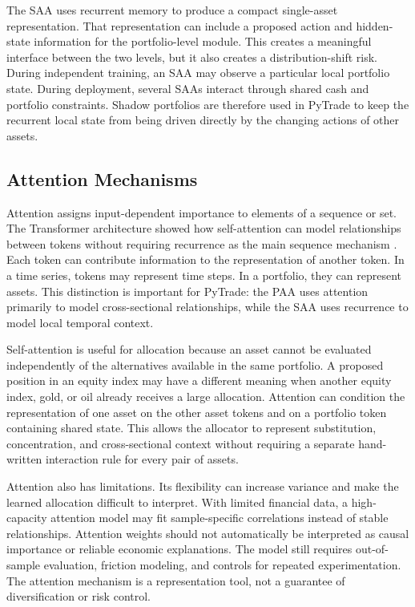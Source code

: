 The SAA uses recurrent memory to produce a compact single-asset representation. That representation can include a proposed action and hidden-state information for the portfolio-level module. This creates a meaningful interface between the two levels, but it also creates a distribution-shift risk. During independent training, an SAA may observe a particular local portfolio state. During deployment, several SAAs interact through shared cash and portfolio constraints. Shadow portfolios are therefore used in PyTrade to keep the recurrent local state from being driven directly by the changing actions of other assets.

\subsection{Attention Mechanisms}


Attention assigns input-dependent importance to elements of a sequence or set. The Transformer architecture showed how self-attention can model relationships between tokens without requiring recurrence as the main sequence mechanism \cite{vaswani2023attentionneed}. Each token can contribute information to the representation of another token. In a time series, tokens may represent time steps. In a portfolio, they can represent assets. This distinction is important for PyTrade: the PAA uses attention primarily to model cross-sectional relationships, while the SAA uses recurrence to model local temporal context.

Self-attention is useful for allocation because an asset cannot be evaluated independently of the alternatives available in the same portfolio. A proposed position in an equity index may have a different meaning when another equity index, gold, or oil already receives a large allocation. Attention can condition the representation of one asset on the other asset tokens and on a portfolio token containing shared state. This allows the allocator to represent substitution, concentration, and cross-sectional context without requiring a separate hand-written interaction rule for every pair of assets.

Attention also has limitations. Its flexibility can increase variance and make the learned allocation difficult to interpret. With limited financial data, a high-capacity attention model may fit sample-specific correlations instead of stable relationships. Attention weights should not automatically be interpreted as causal importance or reliable economic explanations. The model still requires out-of-sample evaluation, friction modeling, and controls for repeated experimentation. The attention mechanism is a representation tool, not a guarantee of diversification or risk control.

